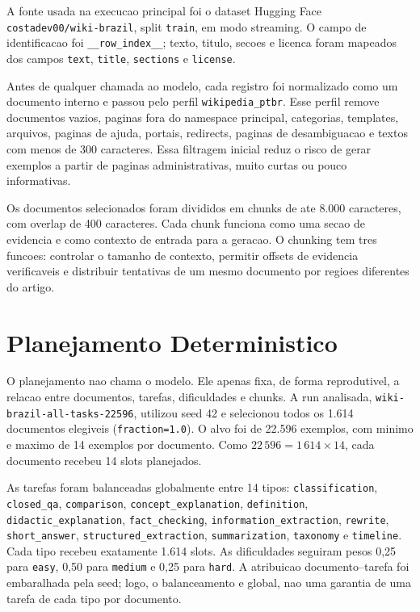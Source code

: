 \documentclass{article}
\newcommand{\runname}{\texttt{wiki-brazil-all-tasks-22596}}
\begin{document}
A fonte usada na execucao principal foi o dataset Hugging Face
\texttt{costadev00/wiki-brazil}, split \texttt{train}, em modo streaming. O
campo de identificacao foi \texttt{\_\_row\_index\_\_}; texto, titulo, secoes e
licenca foram mapeados dos campos \texttt{text}, \texttt{title},
\texttt{sections} e \texttt{license}.

Antes de qualquer chamada ao modelo, cada registro foi normalizado como um
documento interno e passou pelo perfil \texttt{wikipedia\_ptbr}. Esse perfil
remove documentos vazios, paginas fora do namespace principal, categorias,
templates, arquivos, paginas de ajuda, portais, redirects, paginas de
desambiguacao e textos com menos de 300 caracteres. Essa filtragem inicial
reduz o risco de gerar exemplos a partir de paginas administrativas, muito
curtas ou pouco informativas.

Os documentos selecionados foram divididos em chunks de ate 8.000 caracteres,
com overlap de 400 caracteres. Cada chunk funciona como uma secao de evidencia
e como contexto de entrada para a geracao. O chunking tem tres funcoes:
controlar o tamanho de contexto, permitir offsets de evidencia verificaveis e
distribuir tentativas de um mesmo documento por regioes diferentes do artigo.

\section{Planejamento Deterministico}

O planejamento nao chama o modelo. Ele apenas fixa, de forma reprodutivel, a
relacao entre documentos, tarefas, dificuldades e chunks. A run analisada,
\runname{}, utilizou seed 42 e selecionou todos os 1.614 documentos elegiveis
(\texttt{fraction=1.0}). O alvo foi de 22.596 exemplos, com minimo e maximo de
14 exemplos por documento. Como $22\,596 = 1\,614 \times 14$, cada documento
recebeu 14 slots planejados.

As tarefas foram balanceadas globalmente entre 14 tipos:
\texttt{classification}, \texttt{closed\_qa}, \texttt{comparison},
\texttt{concept\_explanation}, \texttt{definition},
\texttt{didactic\_explanation}, \texttt{fact\_checking},
\texttt{information\_extraction}, \texttt{rewrite}, \texttt{short\_answer},
\texttt{structured\_extraction}, \texttt{summarization}, \texttt{taxonomy} e
\texttt{timeline}. Cada tipo recebeu exatamente 1.614 slots. As dificuldades
seguiram pesos 0,25 para \texttt{easy}, 0,50 para \texttt{medium} e 0,25 para
\texttt{hard}. A atribuicao documento--tarefa foi embaralhada pela seed; logo,
o balanceamento e global, nao uma garantia de uma tarefa de cada tipo por
documento.
\end{document}

